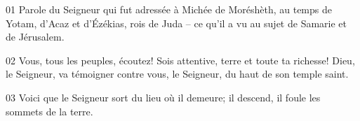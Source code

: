 01 Parole du Seigneur qui fut adressée à Michée de Moréshèth, au temps de Yotam, d’Acaz et d’Ézékias, rois de Juda – ce qu’il a vu au sujet de Samarie et de Jérusalem.

02 Vous, tous les peuples, écoutez! Sois attentive, terre et toute ta richesse! Dieu, le Seigneur, va témoigner contre vous, le Seigneur, du haut de son temple saint.

03 Voici que le Seigneur sort du lieu où il demeure; il descend, il foule les sommets de la terre.
